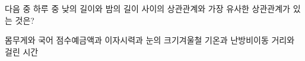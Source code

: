 다음 중 하루 중 낮의 길이와 밤의 길이 사이의 상관관계와 가장 유사한 상관관계가 있는 것은?
\begin{choicesv}{몸무게와 국어 점수}{예금액과 이자}{시력과 눈의 크기}{겨울철 기온과 난방비}{이동 거리와 걸린 시간}\end{choicesv}
